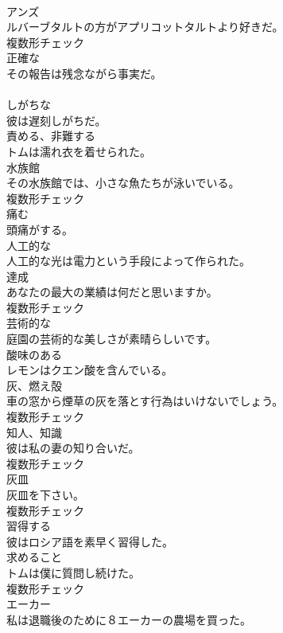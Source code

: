\documentclass[8pt]{extreport}
\begin{document}
\begin{CJK}{UTF8}{min}
\\	[名詞]	アンズ	
\\	ルバーブタルトの方がアプリコットタルトより好きだ。	
\\	複数形チェック
\\	[形容詞]	正確な	
\\	その報告は残念ながら事実だ。	
\\	[形容詞]	
\\	しがちな	
\\	彼は遅刻しがちだ。	
\\	[動詞]	責める、非難する	
\\	トムは濡れ衣を着せられた。	
\\	[名詞]	水族館	
\\	その水族館では、小さな魚たちが泳いでいる。	
\\	複数形チェック
\\	[動詞]	痛む	
\\	頭痛がする。	
\\	[形容詞]	人工的な	
\\	人工的な光は電力という手段によって作られた。	
\\	[名詞]	達成	
\\	あなたの最大の業績は何だと思いますか。	
\\	複数形チェック
\\	[形容詞]	芸術的な	
\\	庭園の芸術的な美しさが素晴らしいです。	
\\	[形容詞]	酸味のある	
\\	レモンはクエン酸を含んでいる。	
\\	[名詞]	灰、燃え殻	
\\	車の窓から煙草の灰を落とす行為はいけないでしょう。	
\\	複数形チェック
\\	[名詞]	知人、知識	
\\	彼は私の妻の知り合いだ。	
\\	複数形チェック
\\	[名詞]	灰皿	
\\	灰皿を下さい。	
\\	複数形チェック
\\	[動詞]	習得する	
\\	彼はロシア語を素早く習得した。	
\\	[名詞]	求めること	
\\	トムは僕に質問し続けた。	
\\	複数形チェック
\\	[名詞]	エーカー	
\\	私は退職後のために８エーカーの農場を買った。	

\end{CJK}
\end{document}
